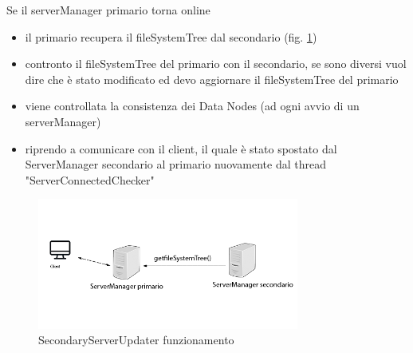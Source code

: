 \documentclass[]{article}
\begin{document}
\vspace{1cm}


Se il serverManager primario torna online
\begin{itemize}
	
	\item il primario recupera il fileSystemTree dal secondario (fig. \ref{fig:SecondaryServerUpdater3})
	
	\item contronto il fileSystemTree del primario con il secondario, se sono diversi vuol dire che è stato modificato ed devo aggiornare il fileSystemTree del primario
	
	\item viene controllata la consistenza dei Data Nodes (ad ogni avvio di un serverManager)
	
	\item riprendo a comunicare con il client, il quale è stato spostato dal ServerManager secondario al primario nuovamente dal thread "ServerConnectedChecker"
	
\end{itemize}


\begin{figure}[h]
	\centering
	\includegraphics[width=8.6cm]{../Img/SecondaryServerUpdater3.png}
	\caption[]{SecondaryServerUpdater funzionamento}
	\label{fig:SecondaryServerUpdater3}
	
\end{figure}
\end{document}
